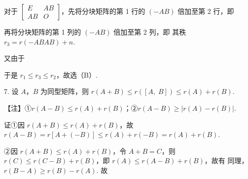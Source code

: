 对于 $\begin{bmatrix}E&AB\\AB&O\end{bmatrix}$，先将分块矩阵的第 1 行的 $(-AB)$ 倍加至第 2 行，即

再将分块矩阵的第 1 列的 $(-AB)$ 倍加至第 2 列，即
其秩 $r_3=r(-ABAB)+n$.

又由于

于是 $r_1\le r_3\le r_2$，故选（B）.

7. 设 $A$，$B$ 为同型矩阵，则 $r(A+B)\le r([A,\;B])\le r(A)+r(B)$.

\begin{fnote}
【注】①$r(A-B)\le r(A)+r(B)$；②$r(A-B)\ge|r(A)-r(B)|$.

证\quad①因 $r(A+B)\le r(A)+r(B)$，故 $r(A-B)=r[A+(-B)]\le r(A)+r(-B)=r(A)+r(B)$.

②因 $r(A+B)\le r(A)+r(B)$，令 $A+B=C$，则 $r(C)\le r(C-B)+r(B)$，即 $r(A)\le r(A-B)+r(B)$，故有
同理，$r(B-A)\ge r(B)-r(A)$. 故
\end{fnote}
